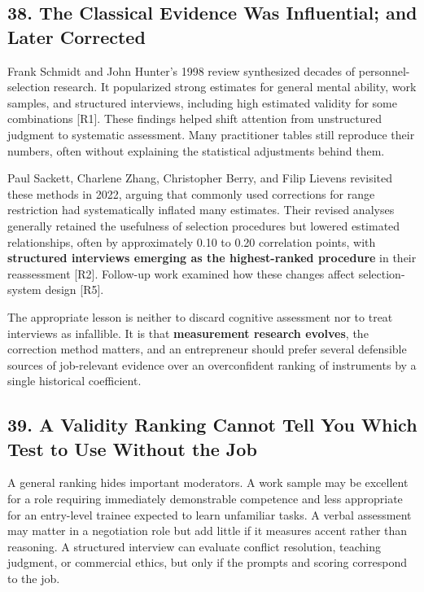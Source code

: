 \subsection*{38. The Classical Evidence Was Influential; and Later Corrected}

Frank Schmidt and John Hunter's 1998 review synthesized decades of personnel-selection research. It popularized strong estimates for general mental ability, work samples, and structured interviews, including high estimated validity for some combinations [R1]. These findings helped shift attention from unstructured judgment to systematic assessment. Many practitioner tables still reproduce their numbers, often without explaining the statistical adjustments behind them.

Paul Sackett, Charlene Zhang, Christopher Berry, and Filip Lievens revisited these methods in 2022, arguing that commonly used corrections for range restriction had systematically inflated many estimates. Their revised analyses generally retained the usefulness of selection procedures but lowered estimated relationships, often by approximately 0.10 to 0.20 correlation points, with \textbf{structured interviews emerging as the highest-ranked procedure} in their reassessment [R2]. Follow-up work examined how these changes affect selection-system design [R5].

The appropriate lesson is neither to discard cognitive assessment nor to treat interviews as infallible. It is that \textbf{measurement research evolves}, the correction method matters, and an entrepreneur should prefer several defensible sources of job-relevant evidence over an overconfident ranking of instruments by a single historical coefficient.

\subsection*{39. A Validity Ranking Cannot Tell You Which Test to Use Without the Job}

A general ranking hides important moderators. A work sample may be excellent for a role requiring immediately demonstrable competence and less appropriate for an entry-level trainee expected to learn unfamiliar tasks. A verbal assessment may matter in a negotiation role but add little if it measures accent rather than reasoning. A structured interview can evaluate conflict resolution, teaching judgment, or commercial ethics, but only if the prompts and scoring correspond to the job.

